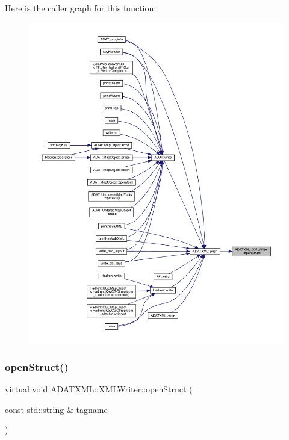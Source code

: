 Here is the caller graph for this function\+:
\nopagebreak
\begin{figure}[H]
\begin{center}
\leavevmode
\includegraphics[width=350pt]{da/da7/classADATXML_1_1XMLWriter_a8f9728743acfd9c15ab5d69bf8800a5e_icgraph}
\end{center}
\end{figure}
\mbox{\label{classADATXML_1_1XMLWriter_a8f9728743acfd9c15ab5d69bf8800a5e}} 
\subsubsection{\texorpdfstring{openStruct()}{openStruct()}\hspace{0.1cm}{\footnotesize\ttfamily [3/3]}}
{\footnotesize\ttfamily virtual void A\+D\+A\+T\+X\+M\+L\+::\+X\+M\+L\+Writer\+::open\+Struct (\begin{DoxyParamCaption}\item[{const std\+::string \&}]{tagname }\end{DoxyParamCaption})\hspace{0.3cm}{\ttfamily [virtual]}}



